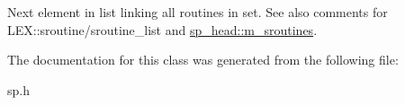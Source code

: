 Next element in list linking all routines in set. See also comments for L\+E\+X\+::sroutine/sroutine\+\_\+list and \mbox{\hyperlink{classsp__head_ab26a4954ad2a135c3876fa3e0f738ed9}{sp\+\_\+head\+::m\+\_\+sroutines}}. 

The documentation for this class was generated from the following file\+:\begin{DoxyCompactItemize}
\item 
sp.\+h\end{DoxyCompactItemize}
